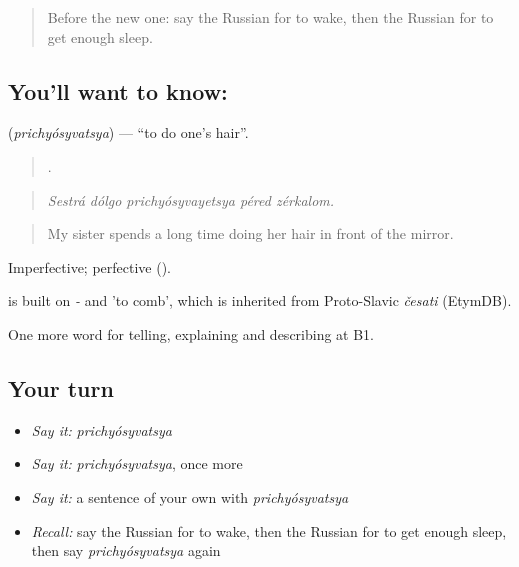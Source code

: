 \label{lesson:RU-C534-prichyosyvatsya}



\begin{quote}
Before the new one: say the Russian for to wake, then the Russian for to get enough sleep.
\end{quote}

\subsection*{You'll want to know: }
\textbf{} (\emph{prichyósyvatsya}) — \textquotedblleft{}to do one's hair\textquotedblright{}.

\begin{quote}
    .
\end{quote}

\begin{quote}
\emph{Sestrá dólgo prichyósyvayetsya péred zérkalom.}
\end{quote}

\begin{quote}
My sister spends a long time doing her hair in front of the mirror.
\end{quote}

Imperfective; perfective  ().

\begin{cousinweb}
\emph{} is built on \emph{-} and \emph{} 'to comb', which is inherited from Proto-Slavic \emph{česati} (EtymDB).
\end{cousinweb}

\begin{grammarlens}[title={What you've built}]
One more word for telling, explaining and describing at B1.
\end{grammarlens}

\subsection*{Your turn}
\begin{itemize}
\raggedright
  \item \emph{Say it:} \emph{prichyósyvatsya}
  \item \emph{Say it:} \emph{prichyósyvatsya}, once more
  \item \emph{Say it:} a sentence of your own with \emph{prichyósyvatsya}
  \item \emph{Recall:} say the Russian for to wake, then the Russian for to get enough sleep, then say \emph{prichyósyvatsya} again
\end{itemize}

